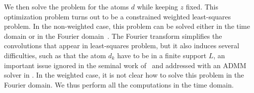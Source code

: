 We then solve the problem for the atoms $d$ while keeping $z$ fixed. This optimization problem turns out to be a constrained weighted least-squares problem. In the non-weighted case, this problem can be solved either in the time domain or in the Fourier domain~\citep{Grosse-etal:2007,heide2015fast,wohlberg2016efficient}. The Fourier transform simplifies the convolutions that appear in least-squares problem, but it also induces several difficulties, such as that the atom $d_k$ have to be in a finite support $L$, an important issue ignored in the seminal work of~\cite{Grosse-etal:2007} and addressed with an ADMM solver  in \cite{heide2015fast,wohlberg2016efficient}.
In the weighted case, it is not clear how to solve this problem in the Fourier domain. We thus perform all the computations in the time domain.





